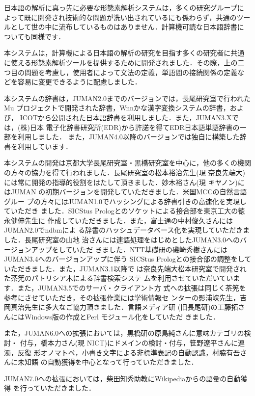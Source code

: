 \documentclass[a4j,titlepage]{jarticle}
\begin{document}
日本語の解析に真っ先に必要な形態素解析システムは，多くの研究グループに
よって既に開発され技術的な問題が洗い出されているにも係わらず，共通のツー
ルとして世の中に流布しているものはありません．計算機可読な日本語辞書に
ついても同様です．

本システムは，計算機による日本語の解析の研究を目指す多くの研究者に共通
に使える形態素解析ツールを提供するために開発されました．その際，上の二
つ目の問題を考慮し，使用者によって文法の定義，単語間の接続関係の定義な
どを容易に変更できるように配慮しました．

本システムの辞書は，JUMAN2.0までのバージョンでは，長尾研究室で行われたMu 
プロジェクトで開発された辞書，Wnnかな漢字変換システムの辞書，および，
ICOTから公開された日本語辞書を利用しました．また，JUMAN3.Xでは，(株)日本
電子化辞書研究所(EDR)から許諾を得てEDR日本語単語辞書の一部を利用しました．
また，JUMAN4.0以降のバージョンでは独自に構築した辞書を利用しています．

本システムの開発は京都大学長尾研究室・黒橋研究室を中心に，他の多くの機関
の方々の協力を得て行われました．長尾研究室の松本裕治先生(現 奈良先端大)
には常に開発の指導的役割をはたして頂きました．妙木裕さん(現 キヤノン)に
はJUMAN の初期バージョンを開発していただきました．米国MCCの自然言語グルー
プの方々にはJUMAN1.0でハッシングによる辞書引きの高速化を実現していただき
ました．SICStus Prologとのソケットによる接合部を東京工大の徳永健伸先生に
作成していただきました．また，富士通の中村俊久さんにはJUMAN2.0でndbmによ
る辞書のハッシュデータベース化を実現していただきました．長尾研究室の山地
治さんには連語処理をはじめとしたJUMAN3.0へのバージョンアップをしていただ
きました．NTT基礎研の磯崎秀樹さんにはJUMAN3.4へのバージョンアップに伴う
SICStus Prologとの接合部の調整をしていただきました．また，JUMAN3.1以降で
は奈良先端大松本研究室で開発された茶筅のパトリシア木による辞書検索システ
ムを利用させていただいています．また，JUMAN3.5でのサーバ・クライアント方
式への拡張は同じく茶筅を参考にさせていただき，その拡張作業には学術情報セ
ンターの影浦峡先生，吉岡真治先生に多大なご協力頂きました．言語メディア研
(旧長尾研)の工藤拓さんにはWindows版の作成とPerl モジュール化をしていただ
きました．

また，JUMAN6.0への拡張においては，黒橋研の原島純さんに意味カテゴリの検討・
付与，橋本力さん(現 NICT)にドメインの検討・付与，笹野遼平さんに連濁，反復
形オノマトペ，小書き文字による非標準表記の自動認識，村脇有吾さんに未知語
の自動獲得を中心となって行っていただきました．

JUMAN7.0への拡張においては，柴田知秀助教にWikipediaからの語彙の自動獲得
を行っていただきました．
\end{document}

